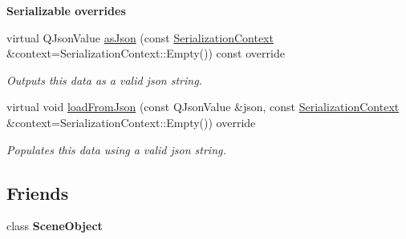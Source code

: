 \begin{Indent}\textbf{ Serializable overrides}\par
\begin{DoxyCompactItemize}
\item 
\mbox{\label{classrev_1_1_component_a28df7dc4f057aaccc6652a7e1343f849}} 
virtual Q\+Json\+Value \mbox{\hyperlink{classrev_1_1_component_a28df7dc4f057aaccc6652a7e1343f849}{as\+Json}} (const \mbox{\hyperlink{structrev_1_1_serialization_context}{Serialization\+Context}} \&context=Serialization\+Context\+::\+Empty()) const override
\begin{DoxyCompactList}\small\item\em Outputs this data as a valid json string. \end{DoxyCompactList}\item 
\mbox{\label{classrev_1_1_component_a88e9bc61eafc496c5de8383321b7be11}} 
virtual void \mbox{\hyperlink{classrev_1_1_component_a88e9bc61eafc496c5de8383321b7be11}{load\+From\+Json}} (const Q\+Json\+Value \&json, const \mbox{\hyperlink{structrev_1_1_serialization_context}{Serialization\+Context}} \&context=Serialization\+Context\+::\+Empty()) override
\begin{DoxyCompactList}\small\item\em Populates this data using a valid json string. \end{DoxyCompactList}\end{DoxyCompactItemize}
\end{Indent}
\subsection*{Friends}
\begin{DoxyCompactItemize}
\item 
\mbox{\label{classrev_1_1_component_a737b3cb474f324a74e7da2d3aeca10c9}} 
class {\bfseries Scene\+Object}
\end{DoxyCompactItemize}

